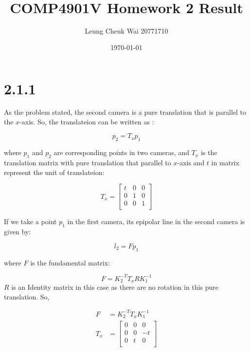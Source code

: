 \documentclass{article}
\title{COMP4901V Homework 2 Result}
\author{Leung Cheuk Wai 20771710}
\date{\today}
\begin{document}
\maketitle
\section*{2.1.1}
As the problem stated, the second camera is a pure translation that is parallel to the $x$-axis. So, the translateion can be written as :

\begin{equation*}
p_2 = T_x p_1
\end{equation*}

where $p_1$ and $p_2$ are corresponding points in two cameras, and $T_x$ is the translation matrix with pure translation that parallel to $x$-axis and $t$ in matrix represent the unit of translateion:

\begin{equation*}
T_x = \begin{bmatrix}
t & 0 & 0 \\
0 & 1 & 0 \\
0 & 0 & 1 \\
\end{bmatrix}
\end{equation*}

If we take a point $p_1$ in the first camera, its epipolar line in the second camera is given by:

\begin{equation*}
l_2 = F p_1
\end{equation*}

where $F$ is the fundamental matrix:

\begin{equation*}
F = K_2^{-T} T_x R K_1^{-1}
\end{equation*}
$R$ is an Identity matrix in this case as there are no rotation in this pure translation. So, 

\begin{align*}
    F &= K_2^{-T} T_x K_1^{-1}\\
T_x &= \begin{bmatrix}
    0 & 0 & 0 \\
    0 & 0 & -t \\
    0 & t & 0 \\
    \end{bmatrix}    
\end{align*} 
\end{document}
